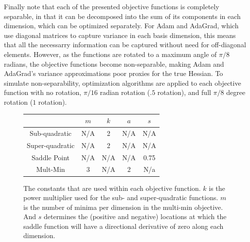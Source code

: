 \documentclass[conference]{ieeeconf}  %
\begin{document}
Finally note that each of the presented objective functions is
completely separable, in that it can be decomposed into the sum of its
components in each dimension, which can be optimized separately.  For
Adam and AdaGrad, which use diagonal matrices to capture variance in
each basis dimension, this means that all the necessarry information
can be captured without need for off-diagonal elements.  However, as
the functions are rotated to a maximum angle of $\pi / 8$ radians, the
objective functions become non-separable, making Adam and AdaGrad's
variance approximations poor proxies for the true Hessian.  To
simulate non-separability, optimization algorithms are applied to each
objective function with no rotation, $\pi / 16$ radian rotation ($.5$
rotation), and full $\pi / 8$ degree rotation ($1$ rotation).

\begin{figure}
  \centering
  \begin{tabular}{|c|c|c|c|c|}
    \hline
    & $m$ & $k$ & $a$ & $s$ \\
    \hline
    Sub-quadratic & N/A & 2 & N/A & N/A \\
    Super-quadratic & N/A & 2 & N/A & N/A \\
    Saddle Point & N/A & N/A & N/A & 0.75 \\
    Mult-Min & 3 & N/A & 2 & N/a \\
    \hline
  \end{tabular}
  \caption{The constants that are used within each objective function. $k$ is the power multiplier used for the sub- and super-quadratic functions. $m$ is the number of minima per dimension in the multi-min objective. And $s$ determines the (positive and negative) locations at which the saddle function will have a directional derivative of zero along each dimension.}
  \label{tab:const}
\end{figure}
\end{document}
